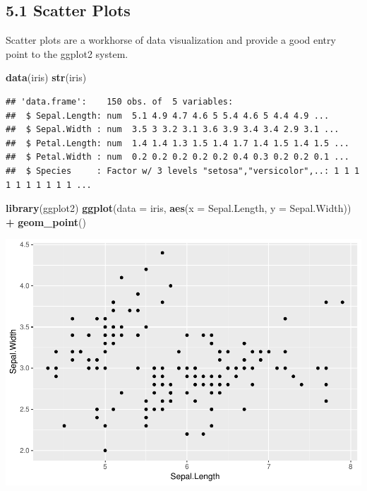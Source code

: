 \documentclass[]{article}
\newenvironment{Shaded}{\begin{snugshade}}{\end{snugshade}}
\newcommand{\KeywordTok}[1]{\textcolor[rgb]{0.13,0.29,0.53}{\textbf{#1}}}
\newcommand{\DataTypeTok}[1]{\textcolor[rgb]{0.13,0.29,0.53}{#1}}
\newcommand{\StringTok}[1]{\textcolor[rgb]{0.31,0.60,0.02}{#1}}
\newcommand{\OperatorTok}[1]{\textcolor[rgb]{0.81,0.36,0.00}{\textbf{#1}}}
\newcommand{\NormalTok}[1]{#1}
\begin{document}
\subsection{5.1 Scatter Plots}\label{scatter-plots}

Scatter plots are a workhorse of data visualization and provide a good
entry point to the ggplot2 system.

\begin{Shaded}
\begin{Highlighting}[]
\KeywordTok{data}\NormalTok{(iris)}
\KeywordTok{str}\NormalTok{(iris)}
\end{Highlighting}
\end{Shaded}

\begin{verbatim}
## 'data.frame':    150 obs. of  5 variables:
##  $ Sepal.Length: num  5.1 4.9 4.7 4.6 5 5.4 4.6 5 4.4 4.9 ...
##  $ Sepal.Width : num  3.5 3 3.2 3.1 3.6 3.9 3.4 3.4 2.9 3.1 ...
##  $ Petal.Length: num  1.4 1.4 1.3 1.5 1.4 1.7 1.4 1.5 1.4 1.5 ...
##  $ Petal.Width : num  0.2 0.2 0.2 0.2 0.2 0.4 0.3 0.2 0.2 0.1 ...
##  $ Species     : Factor w/ 3 levels "setosa","versicolor",..: 1 1 1 1 1 1 1 1 1 1 ...
\end{verbatim}

\begin{Shaded}
\begin{Highlighting}[]
\KeywordTok{library}\NormalTok{(ggplot2)}
\KeywordTok{ggplot}\NormalTok{(}\DataTypeTok{data =}\NormalTok{ iris, }\KeywordTok{aes}\NormalTok{(}\DataTypeTok{x =}\NormalTok{ Sepal.Length, }\DataTypeTok{y =}\NormalTok{ Sepal.Width)) }\OperatorTok{+}
\StringTok{       }\KeywordTok{geom_point}\NormalTok{()}
\end{Highlighting}
\end{Shaded}

\includegraphics{stt-301-programming_files/figure-latex/unnamed-chunk-57-1.pdf}
\end{document}
